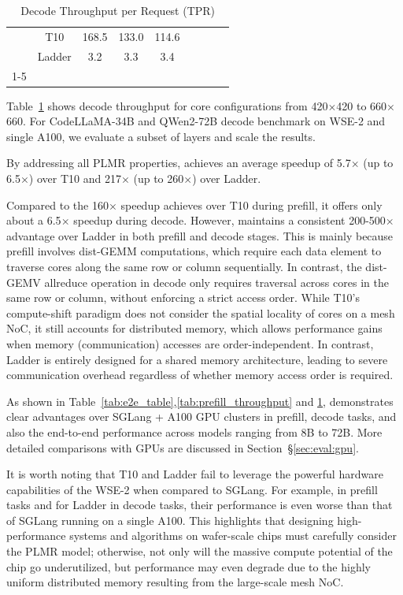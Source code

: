 \begin{table}[t]
{\begin{tabular}{c|c|ccclccc}
 & T10 & \multicolumn{1}{c|}{168.5} & \multicolumn{1}{c|}{133.0} & 114.6 &  & \multicolumn{1}{c|}{} & \multicolumn{1}{c|}{} &  \\
 & Ladder & \multicolumn{1}{c|}{3.2} & \multicolumn{1}{c|}{3.3} & 3.4 &  & \multicolumn{1}{c|}{} & \multicolumn{1}{c|}{} &  \\ \cline{1-5} \cline{7-9} 
\end{tabular}%
    }
  \caption{Decode Throughput per Request (TPR)}
  \vspace{-0.2cm}
\label{tab:decode_throughput}
\end{table}%

 Table~\ref{tab:decode_throughput} shows decode throughput for core configurations from 420$\times$420 to 660$\times$660. For CodeLLaMA-34B and QWen2-72B decode benchmark on WSE-2 and single A100, we evaluate a subset of layers and scale the results.

By addressing all PLMR properties, \sys achieves an average speedup of 5.7$\times$ (up to 6.5$\times$) over T10 and 217$\times$ (up to 260$\times$) over Ladder.

Compared to the 160$\times$ speedup \sys achieves over T10 during prefill, it offers only about a 6.5$\times$ speedup during decode. However, \sys maintains a consistent 200-500$\times$ advantage over Ladder in both prefill and decode stages. This is mainly because prefill involves dist-GEMM computations, which require each data element to traverse cores along the same row or column sequentially. In contrast, the dist-GEMV allreduce operation in decode only requires traversal across cores in the same row or column, without enforcing a strict access order. While T10’s compute-shift paradigm does not consider the spatial locality of cores on a mesh NoC, it still accounts for distributed memory, which allows performance gains when memory (communication) accesses are order-independent. In contrast, Ladder is entirely designed for a shared memory architecture, leading to severe communication overhead regardless of whether memory access order is required.

 As shown in Table~\ref{tab:e2e_table},\ref{tab:prefill_throughput} and \ref{tab:decode_throughput}, \sys demonstrates clear advantages over SGLang + A100 GPU clusters in prefill, decode tasks, and also the end-to-end performance across models ranging from 8B to 72B. More detailed comparisons with GPUs are discussed in Section~\S\ref{sec:eval:gpu}.

It is worth noting that T10 and Ladder fail to leverage the powerful hardware capabilities of the WSE-2 when compared to SGLang. For example, in prefill tasks and for Ladder in decode tasks, their performance is even worse than that of SGLang running on a single A100. This highlights that designing high-performance systems and algorithms on wafer-scale chips must carefully consider the PLMR model; otherwise, not only will the massive compute potential of the chip go underutilized, but performance may even degrade due to the highly uniform distributed memory resulting from the large-scale mesh NoC.


